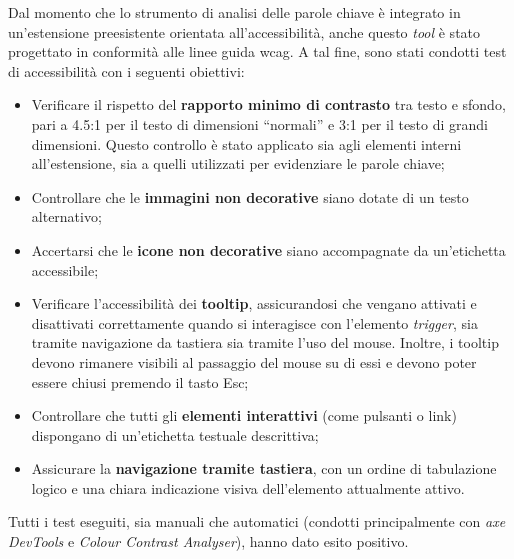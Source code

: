 \par Dal momento che lo strumento di analisi delle parole chiave è integrato in un’estensione preesistente orientata all’accessibilità, anche questo \textit{tool} è stato progettato in conformità alle linee guida \gls{wcag}. A tal fine, sono stati condotti test di accessibilità con i seguenti obiettivi:
\begin{itemize}
  \item Verificare il rispetto del \textbf{rapporto minimo di contrasto} tra testo e sfondo, pari a 4.5:1 per il testo di dimensioni “normali” e 3:1 per il testo di grandi dimensioni. Questo controllo è stato applicato sia agli elementi interni all’estensione, sia a quelli utilizzati per evidenziare le parole chiave;
  \item Controllare che le \textbf{immagini non decorative} siano dotate di un testo alternativo;
  \item Accertarsi che le \textbf{icone non decorative} siano accompagnate da un’etichetta accessibile;
  \item Verificare l’accessibilità dei \textbf{tooltip}, assicurandosi che vengano attivati e disattivati correttamente quando si interagisce con l’elemento \textit{trigger}, sia tramite navigazione da tastiera sia tramite l’uso del mouse. Inoltre, i tooltip devono rimanere visibili al passaggio del mouse su di essi e devono poter essere chiusi premendo il tasto Esc;
  \item Controllare che tutti gli \textbf{elementi interattivi} (come pulsanti o link) dispongano di un’etichetta testuale descrittiva;
  \item Assicurare la \textbf{navigazione tramite tastiera}, con un ordine di tabulazione logico e una chiara indicazione visiva dell’elemento attualmente attivo.
\end{itemize}

\vspace{15pt}
\par\noindent Tutti i test eseguiti, sia manuali che automatici (condotti principalmente con \textit{axe DevTools} e \textit{Colour Contrast Analyser}), hanno dato esito positivo.
